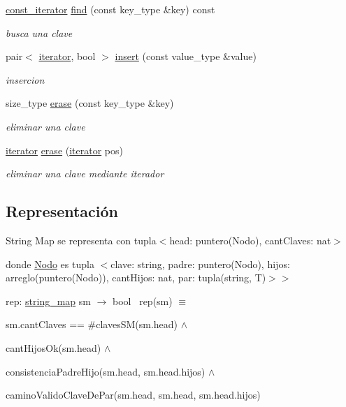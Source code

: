 \begin{DoxyCompactItemize}
\mbox{\hyperlink{classstring__map_1_1const__iterator}{const\+\_\+iterator}} \mbox{\hyperlink{classstring__map_a4542bfa7df12212f10a9bf7bf10d3804}{find}} (const key\+\_\+type \&key) const
\begin{DoxyCompactList}\small\item\em busca una clave \end{DoxyCompactList}\item 
pair$<$ \mbox{\hyperlink{classstring__map_1_1iterator}{iterator}}, bool $>$ \mbox{\hyperlink{classstring__map_a2fff1076bccd20802f03f72a92275b33}{insert}} (const value\+\_\+type \&value)
\begin{DoxyCompactList}\small\item\em insercion \end{DoxyCompactList}\item 
size\+\_\+type \mbox{\hyperlink{classstring__map_a380bf45fbfd19efcda1f9579e5c8600c}{erase}} (const key\+\_\+type \&key)
\begin{DoxyCompactList}\small\item\em eliminar una clave \end{DoxyCompactList}\item 
\mbox{\hyperlink{classstring__map_1_1iterator}{iterator}} \mbox{\hyperlink{classstring__map_aad96e9f05f2a7f4196331e0fcba3bae7}{erase}} (\mbox{\hyperlink{classstring__map_1_1iterator}{iterator}} pos)
\begin{DoxyCompactList}\small\item\em eliminar una clave mediante iterador \end{DoxyCompactList}\end{DoxyCompactItemize}
\subsection*{Representación}
\label{_amgrp804caec2222e5f28d512690182d357cf}%
String Map se representa con tupla$<$head\+: puntero(\+Nodo), cant\+Claves\+: nat$>$

donde \mbox{\hyperlink{structstring__map_1_1Nodo}{Nodo}} es tupla $<$clave\+: string, padre\+: puntero(\+Nodo), hijos\+: arreglo(puntero(\+Nodo)), cant\+Hijos\+: nat, par\+: tupla(string, T)$>$$>$

rep\+: \mbox{\hyperlink{classstring__map}{string\+\_\+map}} sm $\to$ bool~\newline
rep(sm) $\equiv$
\begin{DoxyItemize}
\item sm.\+cant\+Claves == \#claves\+SM(sm.\+head) $\land$
\item cant\+Hijos\+Ok(sm.\+head) $\land$
\item consistencia\+Padre\+Hijo(sm.\+head, sm.\+head.\+hijos) $\land$
\item camino\+Valido\+Clave\+De\+Par(sm.\+head, sm.\+head, sm.\+head.\+hijos)
\end{DoxyItemize}

